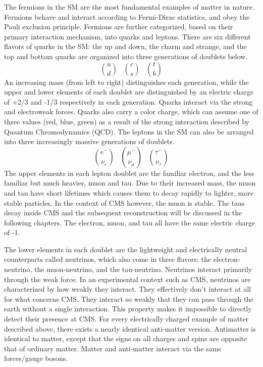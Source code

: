 The fermions in the SM are the most fundamental examples of matter in nature. Fermions behave and interact according to Fermi-Dirac statistics, and obey the Pauli exclusion principle. Fermions are further categorized, based on their primary interaction mechanism,
into quarks and leptons. There are six different flavors of quarks in the SM: the up and down, the charm and strange, and the top and bottom quarks are organized into three generations of doublets below.
\begin{equation}
\binom{u}{d} \;\;\; \binom{c}{s} \;\;\; \binom{t}{b}
\end{equation}
\noindent An increasing mass (from left to right) distinguishes each generation, while the upper and lower elements of each doublet are distinguished by an electric charge of +2/3 and -1/3 respectively in each generation. Quarks interact via the strong and
electroweak forces. Quarks also carry a color charge, which can assume one of three values (red, blue, green) as a result of the strong interaction described by Quantum Chromodynamics (QCD). The leptons in the SM can also be arranged into three increasingly
massive generations of doublets.
\begin{equation}
\binom{e^{-}}{\nu_{e}} \;\;\; \binom{\mu^{-}}{\nu_{\mu}} \;\;\; \binom{\tau^{-}}{\nu_{\tau}}
\end{equation}
\noindent The upper elements in each lepton doublet are the familiar electron, and the less familiar but much heavier, muon and tau. Due to their increased mass, the muon and tau have short lifetimes which causes them to decay rapidly to lighter, more stable particles. In the context of CMS however, the muon is stable. The taus decay inside CMS and the
subsequent reconstruction will be discussed in the following chapters. 
The electron, muon, and tau all have the same electric charge of -1.

The lower elements in each doublet are the lightweight and electrically neutral counterparts called neutrinos, which also come in three
flavors; the electron-neutrino, the muon-neutrino, and the tau-neutrino. Neutrinos interact primarily through the weak force. In an experimental context such as CMS, neutrinos are characterized by
how weakly they interact. They effectively don't interact at all for what concerns CMS. They interact so weakly that they can pass through the earth without a single interaction.
This property makes it impossible to directly detect their presence at CMS. For every electrically charged example of matter described above, there exists a nearly identical anti-matter version. Antimatter is identical to matter, except that the
signs on all charges and spins are opposite that of ordinary matter. Matter and anti-matter interact via the same forces/gauge bosons. 

